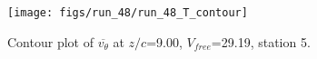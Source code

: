 \begin{figure}[H]
\centering
\texttt{[image: figs/run\_48/run\_48\_T\_contour]}
\caption{Contour plot of $\overline{v_{\theta}}$ at $z/c$=9.00, $V_{free}$=29.19, station 5.}
\label{fig:run_48_T_contour}
\end{figure}


